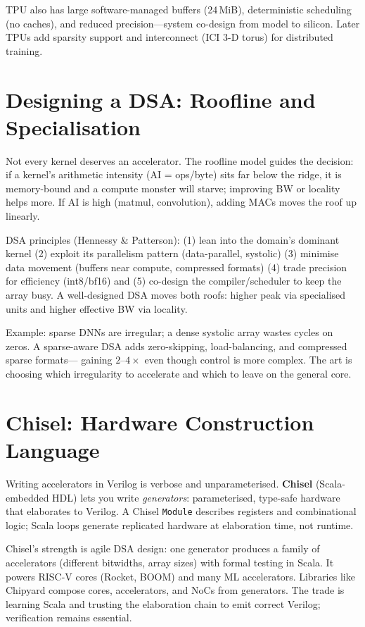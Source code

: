 TPU also has large software-managed buffers (24\,MiB), deterministic scheduling (no
caches), and reduced precision---system co-design from model to silicon. Later TPUs add
sparsity support and interconnect (ICI 3-D torus) for distributed training.

\section{Designing a DSA: Roofline and Specialisation}
Not every kernel deserves an accelerator. The roofline model guides the decision: if a
kernel's arithmetic intensity (AI = ops/byte) sits far below the ridge, it is memory-bound
and a compute monster will starve; improving BW or locality helps more. If AI is high
(matmul, convolution), adding MACs moves the roof up linearly.

DSA principles (Hennessy \& Patterson): (1) lean into the domain's dominant kernel
(2) exploit its parallelism pattern (data-parallel, systolic) (3) minimise data movement
(buffers near compute, compressed formats) (4) trade precision for efficiency (int8/bf16)
and (5) co-design the compiler/scheduler to keep the array busy. A well-designed DSA
moves both roofs: higher peak via specialised units and higher effective BW via locality.

Example: sparse DNNs are irregular; a dense systolic array wastes cycles on zeros.
A sparse-aware DSA adds zero-skipping, load-balancing, and compressed sparse formats---
gaining $2$--$4\times$ even though control is more complex. The art is choosing which
irregularity to accelerate and which to leave on the general core.

\section{Chisel: Hardware Construction Language}
Writing accelerators in Verilog is verbose and unparameterised. \textbf{Chisel}
(Scala-embedded HDL) lets you write \emph{generators}: parameterised, type-safe hardware
that elaborates to Verilog. A Chisel \texttt{Module} describes registers and
combinational logic; Scala loops generate replicated hardware at elaboration time, not
runtime.

Chisel's strength is agile DSA design: one generator produces a family of accelerators
(different bitwidths, array sizes) with formal testing in Scala. It powers RISC-V cores
(Rocket, BOOM) and many ML accelerators. Libraries like Chipyard compose cores,
accelerators, and NoCs from generators. The trade is learning Scala and trusting the
elaboration chain to emit correct Verilog; verification remains essential.

